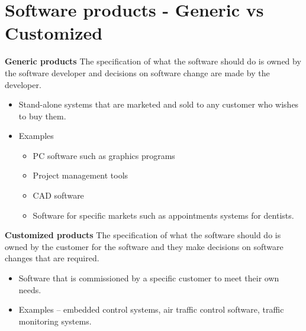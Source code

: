 \documentclass{report}
\begin{document}
\section{Software products - Generic vs Customized}
\noindent \textbf{Generic products} \newline
The specification of what the software should do is owned by the software developer and decisions on software change are made by the developer.
    \begin{itemize}
      \item Stand-alone systems that are marketed and sold to any customer who
wishes to buy them.
      \item Examples
        \begin{itemize}
          \item PC software such as graphics programs
          \item Project management tools
          \item CAD software
          \item Software for specific markets such as appointments systems for dentists.
        \end{itemize}
    \end{itemize}
\noindent \textbf{Customized products} \newline
The specification of what the software should do is owned by the customer for the software and they make decisions on software changes that are required.
    \begin{itemize}
      \item Software that is commissioned by a specific customer to meet their own needs.
      \item Examples – embedded control systems, air traffic control software, traffic monitoring systems.
    \end{itemize}
    
\end{document}
